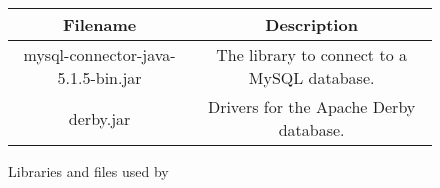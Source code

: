 \begin{figure}[H]\begin{center}\begin{tabular}{|c|c|}\hline Filename & Description\\\hline\hline mysql-connector-java-5.1.5-bin.jar & The library to connect to a MySQL database.\\derby.jar & Drivers for the Apache Derby database.\\\hline\end{tabular}\label{tabular:libraries}\caption{Libraries and files used by \Kieker{}}\end{center}\end{figure}